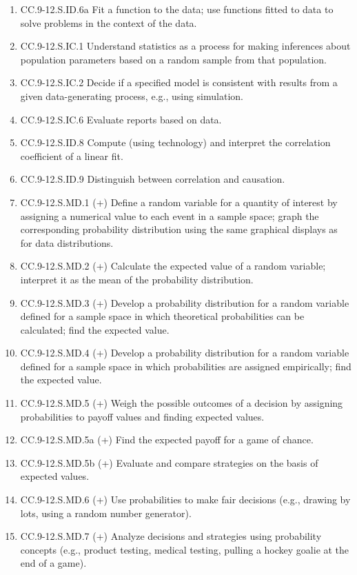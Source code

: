 \documentclass{article}
\begin{document}
\begin{enumerate}
	\item CC.9-12.S.ID.6a Fit a function to the data; use functions fitted to data to solve problems in the context of the data. 
	\item CC.9-12.S.IC.1  Understand statistics as a process for making inferences about population parameters based on a random sample from that population.
	\item CC.9-12.S.IC.2  Decide if a specified model is consistent with results from a given data-generating process, e.g., using simulation. 
	\item CC.9-12.S.IC.6  Evaluate reports based on data.
	\item CC.9-12.S.ID.8  Compute (using technology) and interpret the correlation coefficient of a linear fit.
	\item CC.9-12.S.ID.9  Distinguish between correlation and causation.
	\item CC.9-12.S.MD.1 (+) Define a random variable for a quantity of interest by assigning a numerical value to each event in a sample space; graph the corresponding probability distribution using the same graphical displays as for data distributions.
	\item CC.9-12.S.MD.2 (+) Calculate the expected value of a random variable; interpret it as the mean of the probability distribution.
	\item CC.9-12.S.MD.3 (+) Develop a probability distribution for a random variable defined for a sample space in which theoretical probabilities can be calculated; find the expected value. 
	\item CC.9-12.S.MD.4 (+)  Develop a probability distribution for a random variable defined for a sample space in which probabilities are assigned empirically; find the expected value. 
	\item CC.9-12.S.MD.5 (+)  Weigh the possible outcomes of a decision by assigning probabilities to payoff values and finding expected values.

	\item CC.9-12.S.MD.5a (+) Find the expected payoff for a game of chance. 
	\item CC.9-12.S.MD.5b (+)  Evaluate and compare strategies on the basis of expected values. 
	\item CC.9-12.S.MD.6 (+)  Use probabilities to make fair decisions (e.g., drawing by lots, using a random number generator).
	\item CC.9-12.S.MD.7 (+)  Analyze decisions and strategies using probability concepts (e.g., product testing, medical testing, pulling a hockey goalie at the end of a game).
\end{enumerate}
\newpage
\end{document}

